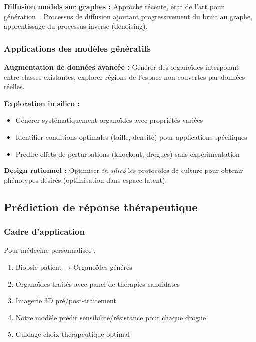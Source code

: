 \textbf{Diffusion models sur graphes :}
Approche récente, état de l'art pour génération~\cite{Sanchez2020}. Processus de diffusion ajoutant progressivement du bruit au graphe, apprentissage du processus inverse (denoising).

\subsubsection{Applications des modèles génératifs}

\textbf{Augmentation de données avancée :}
Générer des organoïdes interpolant entre classes existantes, explorer régions de l'espace non couvertes par données réelles.

\textbf{Exploration in silico :}
\begin{itemize}
    \item Générer systématiquement organoïdes avec propriétés variées
    \item Identifier conditions optimales (taille, densité) pour applications spécifiques
    \item Prédire effets de perturbations (knockout, drogues) sans expérimentation
\end{itemize}

\textbf{Design rationnel :}
Optimiser \textit{in silico} les protocoles de culture pour obtenir phénotypes désirés (optimisation dans espace latent).

\subsection{Prédiction de réponse thérapeutique}

\subsubsection{Cadre d'application}

Pour médecine personnalisée :
\begin{enumerate}
    \item Biopsie patient → Organoïdes générés
    \item Organoïdes traités avec panel de thérapies candidates
    \item Imagerie 3D pré/post-traitement
    \item Notre modèle prédit sensibilité/résistance pour chaque drogue
    \item Guidage choix thérapeutique optimal
\end{enumerate}

